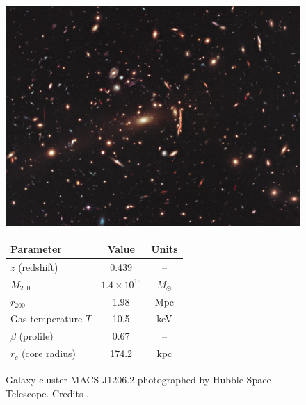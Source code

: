 \begin{figure}
  \centering
  \includegraphics[width=0.62\linewidth]{Images/Chapter3/MACS1206.jpg}
  \caption[Galaxy cluster MACS 1206 by HST]{Galaxy cluster MACS J1206.2 photographed by Hubble Space Telescope. Credits \cite{MACS1206}.}
  \label{fig:macs1206}

  \vspace{8pt} %

  \label{tab:macs1206_parameters}
  \begin{tabular}{@{}lcc@{}}
    \toprule
    \textbf{Parameter} & \textbf{Value} & \textbf{Units} \\
    \midrule
    $z$ (redshift)           & 0.439       & -- \\
        $M_{200}$                & $1.4 \times 10^{15}$ & $M_\odot$ \\
        $r_{200}$                & 1.98        & Mpc \\
        Gas temperature $T$ & 10.5        & keV \\
        $\beta$ (profile)        & 0.67        & -- \\
        $r_c$ (core radius)   & 174.2       & kpc \\
    \bottomrule
  \end{tabular}
\end{figure}
